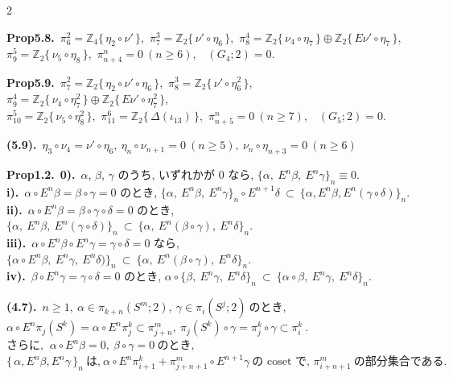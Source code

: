 \documentclass[10pt, leqno]{ltjsarticle}
\newcommand{\Ex}{E}        %
\newcommand{\todai}[2][]{\{\,#2\,\}_{#1}}      %
\newcommand{\gen}[1]{\{\,#1\,\}}       %
\newcommand{\pis}[2]{\pi_{#1}(#2)}       %
\newcommand{\pit}[2]{\pi_{#1}^{#2}}
\numberwithin{equation}{section}
\theoremstyle{plain}
\theoremstyle{definition}
\theoremstyle{remark}
\begin{document}
\begin{paracol}{2}
\switchcolumn

\noindent
\textbf{Prop5.8.}\
\(\pi^{2}_{6}=\mathbb Z_4\gen{\eta_{2}\circ\nu'},\) \quad
\(\pi^{3}_{7}=\mathbb Z_2\gen{\nu'\circ\eta_6},\) \quad
\(\pi^{4}_{8}=\mathbb Z_2\gen{\nu_{4}\circ\eta_7}\oplus \mathbb Z_2\gen{E\nu'\circ\eta_7},\) \\
\(\pi^{5}_{9}=\mathbb Z_2\gen{\nu_{5}\circ\eta_8},\) \quad
\(\pi^{n}_{n+4}=0\ (n\ge6),\) \
\((G_{4};2)=0.\)

\noindent
\textbf{Prop5.9.}\
\(\pi^{2}_{7}=\mathbb Z_2\gen{\eta_{2}\circ\nu'\circ\eta_6},\) \quad
\(\pi^{3}_{8}=\mathbb Z_2\gen{\nu'\circ\eta_6^2},\) \quad
\(\pi^{4}_{9}=\mathbb Z_2\gen{\nu_{4}\circ\eta_7^2}\oplus \mathbb Z_2\gen{E\nu'\circ\eta_7^2},\) \\
\(\pi^{5}_{10}=\mathbb Z_2\gen{\nu_{5}\circ\eta_8^2},\) \quad
\(\pi^{6}_{11}=\mathbb Z_2\gen{\Delta(\iota_{13})},\) \quad
\(\pi^{n}_{n+5}=0\ (n\ge7),\) \
\((G_{5};2)=0.\)

\noindent
\textbf{(5.9).}\
\(\eta_3\circ \nu_4= \nu'\circ \eta_6,\
\eta_n\circ \nu_{n+1}=0\ (n\ge5),\
\nu_n\circ \eta_{n+3}=0\ (n\ge6)\)

\noindent
\textbf{Prop1.2.}\
\textbf{0).}\ $\alpha$, $\beta$, $\gamma$ のうち, いずれかが $0$ なら,
\(
\{\alpha,\ \Ex^n\beta,\ \Ex^n\gamma\}_n\equiv0.
\)\\
\textbf{i).}\ $\alpha\circ \Ex^n\beta=\beta\circ\gamma=0$ のとき,
\(
\{\alpha,\ \Ex^n\beta,\ \Ex^n\gamma\}_n\circ\Ex^{n+1}\delta\ \subset\ \{\alpha,\Ex^n \beta, \Ex^n(\gamma\circ\delta)\}_n.
\)\\
\textbf{ii).}\ $\alpha\circ \Ex^n\beta=\beta\circ\gamma\circ\delta=0$ のとき,
\(
\{\alpha,\ \Ex^n\beta,\ \Ex^n(\gamma\circ\delta)\}_n\ \subset\ \{\alpha,\ \Ex^n(\beta\circ\gamma),\ \Ex^n\delta\}_n .
\)\\
\textbf{iii).}\ $\alpha\circ\Ex^n\beta\circ\Ex^n\gamma=\gamma\circ\delta=0$ なら,
\(
\{\alpha\circ\Ex^n\beta,\ \Ex^n\gamma,\ \Ex^n\delta)\}_n\ \subset\ \{\alpha,\ \Ex^n(\beta\circ\gamma),\ \Ex^n\delta\}_n .
\)\\
\textbf{iv).}\ $\beta\circ\Ex^n\gamma=\gamma\circ\delta=0$ のとき,
\(
\alpha\circ\{\beta,\ \Ex^n\gamma,\ \Ex^n\delta\}_n\ \subset\ \{\alpha\circ\beta,\ \Ex^n\gamma,\ \Ex^n\delta\}_n .
\)

\noindent
\textbf{(4.7).}\
\(n\ge1, \ \alpha\in\pis{k+n}{S^m; 2},\ \gamma\in\pis{i}{S^j; 2}
    \ \text{のとき, }\)\\
\(\alpha\circ E^n\pis{j}{S^k} = \alpha\circ E^n \pit{j}{k}
  \subset \pit{j+n}{m},
  \ \pis{j}{S^k}\circ\gamma = \pit{j}{k}\circ\gamma \subset\pit{i}{k}\ . \)\\
\(\text{さらに, }\ \alpha\circ E^n\beta=0,\ \beta\circ\gamma = 0 \ \text{のとき, }\)\\
\(\todai[n]{\alpha, E^n\beta, E^n\gamma}\ \text{は,}\
  \alpha\circ E^n\pit{i+1}{k} + \pit{j+n+1}{m}\circ E^{n+1}\gamma\
  \text{の coset で, }\pit{i+n+1}{m} \ \text{の部分集合である. }\)


\end{paracol}
\end{document}
